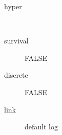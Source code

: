 \begin{description}
	\item[hyper]\ 
	 \item[ survival ] FALSE 
	 \item[ discrete ] FALSE 
	 \item[ link ] default log 
\end{description}
